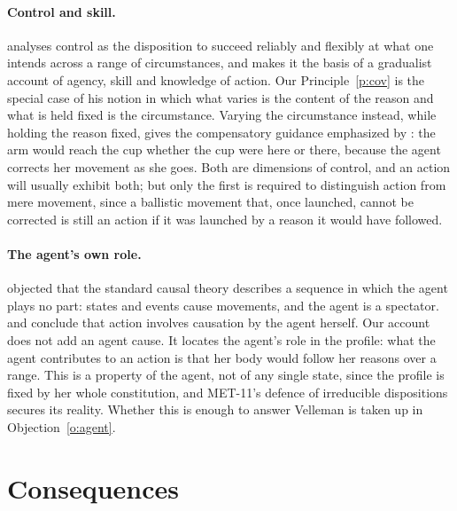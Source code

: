 \documentclass{situationist-preprint}
\begin{document}
\paragraph{Control and skill.} \citet{Shepherd2021} analyses control as the disposition to succeed reliably and flexibly at what one intends across a range of circumstances, and makes it the basis of a gradualist account of agency, skill and knowledge of action. Our Principle~\ref{p:cov} is the special case of his notion in which what varies is the content of the reason and what is held fixed is the circumstance. Varying the circumstance instead, while holding the reason fixed, gives the compensatory guidance emphasized by \citet{Frankfurt1978}: the arm would reach the cup whether the cup were here or there, because the agent corrects her movement as she goes. Both are dimensions of control, and an action will usually exhibit both; but only the first is required to distinguish action from mere movement, since a ballistic movement that, once launched, cannot be corrected is still an action if it was launched by a reason it would have followed.

\paragraph{The agent's own role.} \citet{Velleman1992} objected that the standard causal theory describes a sequence in which the agent plays no part: states and events cause movements, and the agent is a spectator. \citet{Hyman2015} and \citet{Steward2012} conclude that action involves causation by the agent herself. Our account does not add an agent cause. It locates the agent's role in the profile: what the agent contributes to an action is that her body would follow her reasons over a range. This is a property of the agent, not of any single state, since the profile is fixed by her whole constitution, and MET-11's defence of irreducible dispositions secures its reality. Whether this is enough to answer Velleman is taken up in Objection~\ref{o:agent}.

\section{Consequences}\label{s:consequences}
\end{document}
